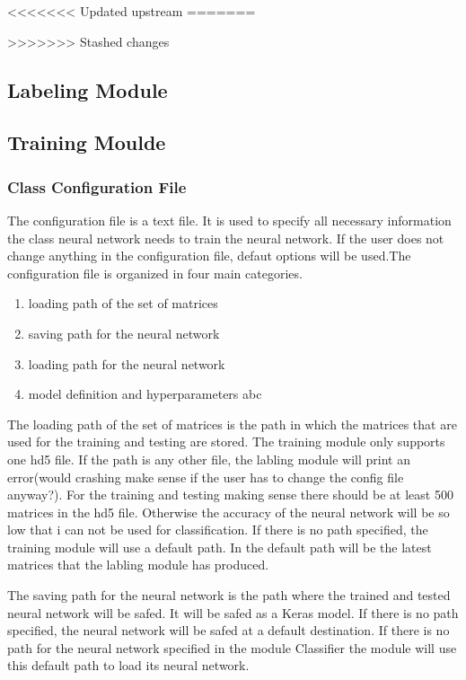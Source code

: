 \documentclass[parskip=full]{scrartcl}
\begin{document}
<<<<<<< Updated upstream
=======

>>>>>>> Stashed changes
\subsection{Labeling Module}
\subsection{Training Moulde}
\subsubsection{Class Configuration File}
The configuration file is a text file.
It is used to specify all necessary information the class neural network needs to train the neural network.
If the user does not change anything in the configuration file, defaut options will be used.The configuration file is organized in four main categories. 
\begin{enumerate}
\item loading path of the set of matrices 
\item saving path for the neural network
\item loading path for the neural network
\item model definition and hyperparameters abc
\end{enumerate}
The loading path of the set of matrices is the path in which the matrices that are used for the training and testing are stored.
The training module only supports one hd5 file.
If the path is any other file, the labling module will print an error(would crashing make sense if the user has to change the config file anyway?).
For the training and testing making sense there should be at least 500 matrices in the hd5 file.
Otherwise the accuracy of the neural network will be so low that i can not be used for classification.
If there is no path specified, the training module will use a default path.
In the default path will be the latest matrices that the labling module has produced. \newline

The saving path for the neural network is the path where the trained and tested neural network will be safed.
It will be safed as a Keras model.
If there is no path specified, the neural network will be safed at a default destination.
If there is no path for the neural network specified in the module Classifier the module will use this default path to load its neural network.\newline
\end{document}
